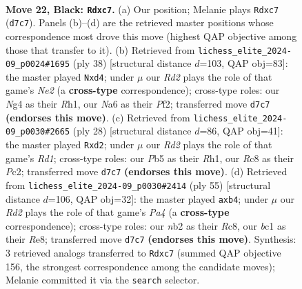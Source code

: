 \documentclass[11pt]{article}
\begin{document}
\clearpage

\begin{figure}[p]\centering
\begin{subfigure}{0.46\textwidth}\centering
\resizebox{\linewidth}{!}{%
\newchessgame
\chessboard[
  setfen={2r1b1k1/p1Qr1pp1/n3p3/1p5p/3P1Pn1/1P4P1/1N2P2P/R1B1RBK1 b - - 0 22},
  showmover=false,
  pgfstyle=straightmove, color=movearrow, markmove={d7-c7}
]}
\caption{}
\end{subfigure}\hfill
\begin{subfigure}{0.46\textwidth}\centering
\resizebox{\linewidth}{!}{%
\newchessgame
\chessboard[
  setfen={rnbr4/pp2p2k/7p/4Np2/1n1q2pP/4P3/PP1RNPP1/4KB1R w K - 0 20},
  showmover=false,
  pgfstyle=straightmove, color=movearrow, markmove={e2-d4}
]}
\caption{}
\end{subfigure}
\\[4pt]
\begin{subfigure}{0.46\textwidth}\centering
\resizebox{\linewidth}{!}{%
\newchessgame
\chessboard[
  setfen={2r1kb1r/1p3p1p/p2pbp2/3N4/4Pp2/8/PPPq2PP/1K1R1B1R w k - 0 15},
  showmover=false,
  pgfstyle=straightmove, color=movearrow, markmove={d1-d2}
]}
\caption{}
\end{subfigure}\hfill
\begin{subfigure}{0.46\textwidth}\centering
\resizebox{\linewidth}{!}{%
\newchessgame
\chessboard[
  setfen={2r1rbk1/1b3p1p/6p1/p2pPpP1/1Q2nP2/3B4/1PP1N2P/3R1RBK b - - 0 28},
  showmover=false,
  pgfstyle=straightmove, color=movearrow, markmove={a5-b4}
]}
\caption{}
\end{subfigure}
\caption{\textbf{Move 22, Black: \texttt{Rdxc7}.} (a) Our position; Melanie plays \texttt{Rdxc7} (\texttt{d7c7}). Panels (b)--(d) are the retrieved master positions whose correspondence most drove this move (highest QAP objective among those that transfer to it). (b) Retrieved from \texttt{lichess\_elite\_2024-09\_p0024\#1695} (ply 38) [structural distance $d$=103, QAP obj=83]: the master played \texttt{Nxd4}; under $\mu$ our \emph{Rd2} plays the role of that game's \emph{Ne2} (a \textbf{cross-type} correspondence); cross-type roles: our \emph{N}g4 as their \emph{R}h1, our \emph{N}a6 as their \emph{P}f2; transferred move \texttt{d7c7} \textbf{(endorses this move)}. (c) Retrieved from \texttt{lichess\_elite\_2024-09\_p0030\#2665} (ply 28) [structural distance $d$=86, QAP obj=41]: the master played \texttt{Rxd2}; under $\mu$ our \emph{Rd2} plays the role of that game's \emph{Rd1}; cross-type roles: our \emph{P}b5 as their \emph{R}h1, our \emph{R}c8 as their \emph{P}c2; transferred move \texttt{d7c7} \textbf{(endorses this move)}. (d) Retrieved from \texttt{lichess\_elite\_2024-09\_p0030\#2414} (ply 55) [structural distance $d$=106, QAP obj=32]: the master played \texttt{axb4}; under $\mu$ our \emph{Rd2} plays the role of that game's \emph{Pa4} (a \textbf{cross-type} correspondence); cross-type roles: our \emph{n}b2 as their \emph{R}c8, our \emph{b}c1 as their \emph{R}e8; transferred move \texttt{d7c7} \textbf{(endorses this move)}. Synthesis: 3 retrieved analogs transferred to \texttt{Rdxc7} (summed QAP objective 156, the strongest correspondence among the candidate moves); Melanie committed it via the \texttt{search} selector.}
\label{fig:thought-m43}
\end{figure}
\end{document}
